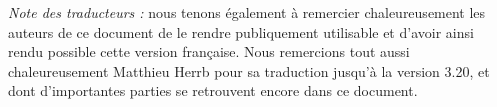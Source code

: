 
\emph{Note des traducteurs :} nous tenons également à remercier
chaleureusement les auteurs de ce document de le rendre publiquement
utilisable et d'avoir ainsi rendu possible cette version française. Nous
remercions tout aussi chaleureusement Matthieu Herrb pour sa traduction
jusqu'à la version 3.20, et dont d'importantes parties se retrouvent
encore dans ce document.

\pagebreak
\endinput
%

